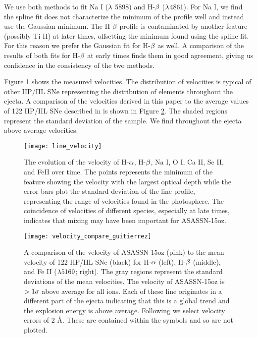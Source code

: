 \documentclass[a4paper,fleqn,usenatbib]{mnras}
\begin{document}
We use both methods to fit Na I ($\rm{\lambda}$ 5898) and H-$\rm{\beta}$ ($\rm{\lambda}$4861). 
For Na I, we find the spline fit does not characterize the minimum of the profile well and instead use the Gaussian minimum. 
The H-$\rm{\beta}$ profile is contaminated by another feature (possibly Ti II) at later times, offsetting the minimum found using the spline fit. 
For this reason we prefer the Gaussian fit for H-$\rm{\beta}$ as well. 
A comparison of the results of both fits for H-$\rm{\beta}$ at early times finds them in good agreement, giving us confidence in the consistency of the two methods.

Figure \ref{fig:velocity} shows the measured velocities. 
The distribution of velocities is typical of other IIP/IIL SNe representing the distribution of elements throughout the ejecta. 
A comparison of the velocities derived in this paper to the average values of 122 IIP/IIL SNe described in \citet{2017gutierrez} is shown in Figure \ref{fig:VelocityCompare}. 
The shaded regions represent the standard deviation of the sample.
We find throughout the ejecta above average velocities.
\begin{figure}
\begin{center}
\texttt{[image: line\_velocity]}
\caption{The evolution of the velocity of H-$\rm{\alpha}$, H-$\rm{\beta}$, Na I, O I, Ca II, Sc II, and FeII over time. 
The points represents the minimum of the feature showing the velocity with the largest optical depth while the error bars plot the standard deviation of the line profile, representing the range of velocities found in the photosphere.
The coincidence of velocities of different species, especially at late times, indicates that mixing may have been important for ASASSN-15oz.}
\label{fig:velocity}
\end{center}
\end{figure}
\begin{figure*}
\begin{center}
\texttt{[image: velocity\_compare\_guitierrez]}
\caption{A comparison of the velocity of ASASSN-15oz (pink) to the mean velocity of 122 IIP/IIL SNe \citep{2017gutierrez} (black) for H-$\rm{\alpha}$ (left), H-$\rm{\beta}$ (middle), and Fe II ($\rm{\lambda 5169}$; right). 
The gray regions represent the standard deviations of the mean velocities.
The velocity of ASASSN-15oz is $\rm{>1\sigma}$ above average for all ions. 
Each of these line originates in a different part of the ejecta indicating that this is a global trend and the explosion energy is above average. 
Following \citep{2012silverman} we select velocity errors of 2 \AA.
These are contained within the symbols and so are not plotted.}
\label{fig:VelocityCompare}
\end{center}
\end{figure*}
\end{document}

